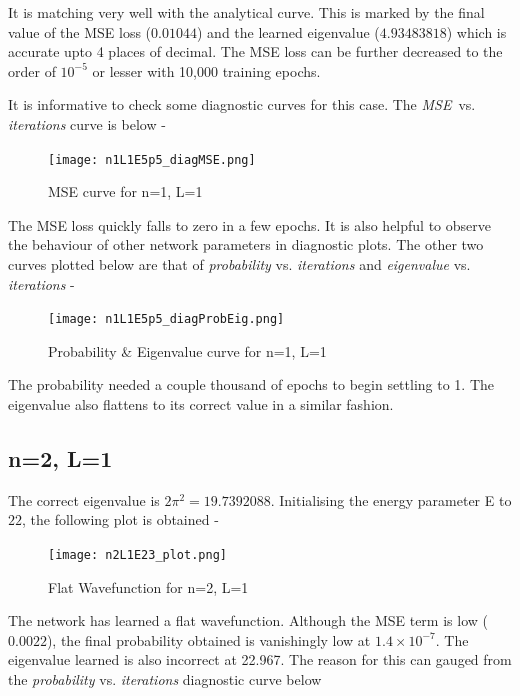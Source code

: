 \documentclass{article}
\newcommand{\MSE}{\textit{MSE}}
\newcommand{\iterations}{\textit{iterations} }
\newcommand{\eigenvalue}{\textit{eigenvalue} }
\newcommand{\probability}{\textit{probability} }
\begin{document}
\justify
It is matching very well with the analytical curve. This is marked by the final value of the MSE loss ($0.01044$) and the learned eigenvalue ($4.93483818$) which is accurate upto 4 places of decimal. The MSE loss can be further decreased to the order of $10^{-5}$ or lesser with 10,000 training epochs.

\justify
It is informative to check some diagnostic curves for this case. The \MSE \ vs. \iterations curve is below -

\begin{figure}[!htb]
    \centering
    \texttt{[image: n1L1E5p5\_diagMSE.png]}
    \label{fig:n1L1_MSE}
    \caption{MSE curve for n=1, L=1}
\end{figure}

\justify
The MSE loss quickly falls to zero in a few epochs. It is also helpful to observe the behaviour of other network parameters in diagnostic plots. The other two curves plotted below are that of \probability vs. \iterations and \eigenvalue vs. \iterations -

\begin{figure}[!htb]
    \centering
    \texttt{[image: n1L1E5p5\_diagProbEig.png]}
    \label{fig:n2L3_probEig}
    \caption{Probability \& Eigenvalue curve for n=1, L=1}
\end{figure}

\justify
The probability needed a couple thousand of epochs to begin settling to 1. The eigenvalue also flattens to its correct value in a similar fashion.

\subsection{n=2, L=1}

\justify
The correct eigenvalue is $\displaystyle{2\pi^2} = 19.7392088$. Initialising the energy parameter E to $22$, the following plot is obtained - 

\begin{figure}[!htb]
    \centering
    \texttt{[image: n2L1E23\_plot.png]}
    \label{fig:n2L1_plot}
    \caption{Flat Wavefunction for n=2, L=1}
\end{figure}

\justify
The network has learned a flat wavefunction. Although the MSE term is low ($0.0022$), the final probability obtained is vanishingly low at $1.4 \times 10^{-7}$. The eigenvalue learned is also incorrect at 22.967. The reason for this can gauged from the \probability vs. \iterations diagnostic curve below
\end{document}

